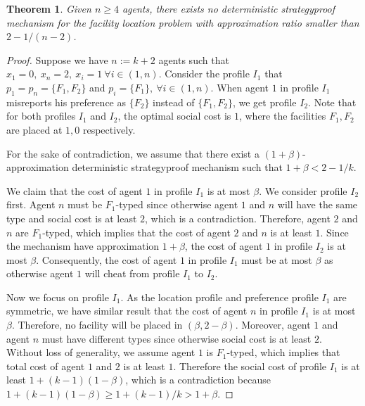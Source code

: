 \documentclass[twoside,11pt]{article}
\newtheorem{theorem}{Theorem}
\begin{document}
\begin{theorem}\label{t-min-social-lower}
Given $n \ge 4$ agents, there exists no deterministic strategyproof mechanism for the facility location problem with approximation ratio smaller than $2 - 1/(n-2)$.
\end{theorem}
\begin{proof}
Suppose we have $n := k + 2$ agents such that $x_1 = 0,~x_n = 2,~x_i = 1 ~\forall i \in (1,n)$.
Consider the profile $I_1$ that $p_1 = p_n = \{F_1,F_2\}$ and $p_i = \{F_1\}, ~\forall i \in (1,n)$.
When agent $1$ in profile $I_1$ misreports his preference as $\{F_2\}$ instead of $\{F_1,F_2\}$, we get profile $I_2$.
Note that for both profiles $I_1$ and $I_2$, the optimal social cost is $1$, where the facilities $F_1,F_2$ are placed at $1,0$ respectively.

For the sake of contradiction, we assume that there exist a $(1+\beta)$-approximation deterministic strategyproof mechanism such that $1+\beta < 2 - 1/k$.

We claim that the cost of agent $1$ in profile $I_1$ is at most $\beta$.
We consider profile $I_2$ first. Agent $n$ must be $F_1$-typed since otherwise agent $1$ and $n$ will have the same type and social cost is at least $2$, which is a contradiction.
Therefore, agent $2$ and $n$ are $F_1$-typed, which implies that the cost of agent $2$ and $n$ is at least $1$.
Since the mechanism have approximation $1+\beta$, the cost of agent $1$ in profile $I_2$ is at most $\beta$.
Consequently, the cost of agent $1$ in profile $I_1$ must be at most $\beta$ as otherwise agent $1$ will cheat from profile $I_1$ to $I_2$.

Now we focus on profile $I_1$.
As the location profile and preference profile $I_1$ are symmetric, we have similar result that the cost of agent $n$ in profile $I_1$ is at most $\beta$. Therefore,  no facility will be placed in $(\beta,2-\beta)$.
Moreover, agent $1$ and agent $n$ must have different types since otherwise social cost is at least $2$. Without loss of generality, we assume agent $1$ is $F_1$-typed, which implies that total cost of agent $1$ and $2$ is at least $1$. Therefore the social cost of profile $I_1$ is at least $1+(k-1)(1-\beta)$, which is a contradiction because $1+(k-1)(1-\beta) \ge 1+(k-1)/k > 1 + \beta$.
\end{proof}
\end{document}
